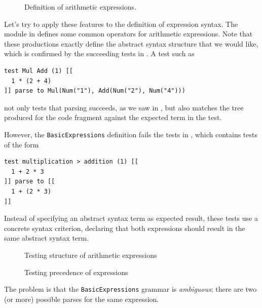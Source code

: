 \begin{figure}

\caption{Definition of arithmetic expressions.}
\end{figure}

Let's try to apply these features to the definition of expression syntax. 
The module in  defines some common operators for
arithmetic expressions.
Note that these productions exactly define the abstract syntax structure that we
would like, which is confirmed by the succeeding tests in
. A test such as

\begin{lstlisting}[language=SPT]
test Mul Add (1) [[
  1 * (2 + 4)
]] parse to Mul(Num("1"), Add(Num("2"), Num("4")))
\end{lstlisting}

not only tests that parsing succeeds, as we saw in , but also
matches the tree produced for the code fragment against the expected term in the
test.

However, the \texttt{BasicExpressions} definition fails the tests in
, which contains tests of the form

\begin{lstlisting}[language=SPT]
test multiplication > addition (1) [[
  1 + 2 * 3
]] parse to [[
  1 + (2 * 3)
]]
\end{lstlisting}

Instead of specifying an abstract syntax term as expected result, these tests
use a concrete syntax criterion, declaring that both expressions should result
in the same abstract syntax term.

\begin{figure}

\caption{Testing structure of arithmetic expressions}
\end{figure}


\begin{figure}

\caption{Testing precedence of expressions}
\end{figure}

The problem is that the \texttt{BasicExpressions} grammar is \emph{ambiguous};
there are two (or more) possible parses for the same expression. 

